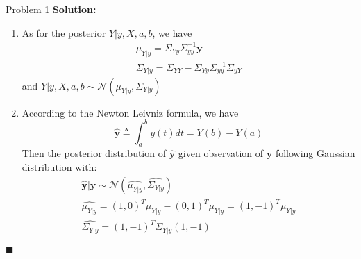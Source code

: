 \documentclass{article}
\newenvironment{solution}                               %
{\textbf{Solution:} }{$\blacksquare$}                   %
\newcommand{\Gaussian}{\mathcal{N}}                     %
\renewcommand{\vec}[1]{\mathbf{#1}}                     %
\begin{document}
\begin{section}{Problem 1}
\begin{solution}
\begin{enumerate}[label=\alph*)]
                \item %
                As for the posterior $Y|y, X, a, b$, we have
                \begin{gather*}
                    \mu_{Y|y} = \Sigma_{Yy} \Sigma_{yy}^{-1} \vec{y} \\
                    \Sigma_{Y|y} = \Sigma_{YY} - \Sigma_{Yy} \Sigma_{yy}^{-1} \Sigma_{yY}
                \end{gather*}
                and $Y|y, X, a, b \sim \Gaussian(\mu_{Y|y}, \Sigma_{Y|y})$
                
                \item %
                According to the Newton Leivniz formula, we have
                $$
                    \vec{\hat{y}} \triangleq \int_{a}^{b} y(t) dt = Y(b) - Y(a)
                $$
                Then the posterior distribution of $\vec{\hat{y}}$ given observation of $\vec{y}$ following Gaussian distribution with:
                \begin{gather*}
                    \vec{\hat{y} | y} \sim \Gaussian(\hat{\mu_{Y|y}}, \hat{\Sigma_{Y|y}})
                    \\
                    \hat{\mu_{Y|y}} = (1,0)^T \mu_{Y|y} - (0,1)^T \mu_{Y|y} = (1,-1)^T \mu_{Y|y} \\
                    \hat{\Sigma_{Y|y}} = (1,-1)^T \Sigma_{Y|y} (1,-1)
                \end{gather*}
                
            \end{enumerate}
        \end{solution}
    \end{section}
\end{document}
